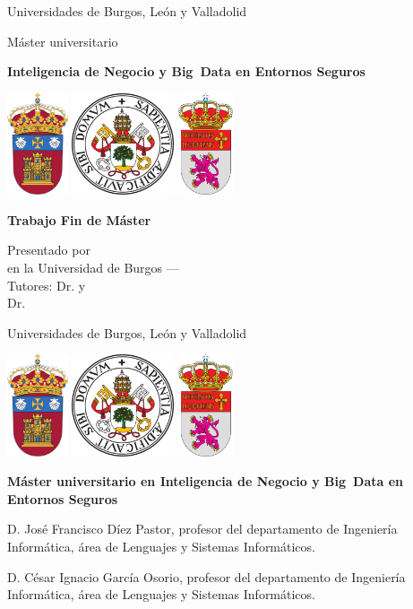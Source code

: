 \documentclass[a4paper,12pt,twoside]{memoir}
\title{\titulo}
\author{\nombre}
\date{\fecha}
\makeatletter
\def\maketitle{
	\null
	\thispagestyle{empty}
	\begin{center}%
		{\noindent\LARGE Universidades de Burgos, León y Valladolid}\vspace{.5cm}%

		{\noindent\large Máster universitario}\vspace{.5cm}%

		{\noindent\LARGE \textbf{Inteligencia de Negocio y Big~Data en Entornos Seguros}}\vspace{.5cm}%
	\end{center}%

	\begin{center}%
		\includegraphics[height=3cm]{img/escudoUBU} \hspace{1cm}
		\includegraphics[height=3cm]{img/escudoUVA} \hspace{1cm}
		\includegraphics[height=3cm]{img/escudoULE} \vspace{1cm}%
	\end{center}%

	\vfill
	\colorbox{cpardoBox}{%
		\begin{minipage}{.9\textwidth}
			\vspace{.4cm}\large
			\begin{center}
				\textbf{Trabajo Fin de Máster}\vspace{.6cm}\\
				\textbf{\Large\@title{}}
			\end{center}
			\vspace{.2cm}
		\end{minipage}

	}%
	\vfill
	\begin{center}%
		{%
			\noindent\Large
			Presentado por \@author{}\\
			en la Universidad de Burgos --- \@date{}\\[1em]
			Tutores: Dr. \@tutor{} y\\\hspace{3.7em}Dr. \@cotutor{}
		}%
	\end{center}%
	\null
	\cleardoublepage
}
\newcommand{\nombretutor}{José Francisco Díez Pastor}
\newcommand{\nombrecotutor}{César Ignacio García Osorio}
\makeatother
\begin{document}
\maketitle

\newpage\null\thispagestyle{empty}\newpage


\thispagestyle{empty}


\noindent
\begin{center}%
	{\noindent\Huge Universidades de Burgos, León y Valladolid}\vspace{.5cm}%

\begin{center}%
	\includegraphics[height=3cm]{img/escudoUBU} \hspace{1cm}
	\includegraphics[height=3cm]{img/escudoUVA} \hspace{1cm}
	\includegraphics[height=3cm]{img/escudoULE} \vspace{1cm}%
\end{center}%

	{\noindent\Large \textbf{Máster universitario en Inteligencia de Negocio y Big~Data en Entornos Seguros}}\vspace{.5cm}%
\end{center}%



\noindent D. \nombretutor, profesor del departamento de Ingeniería Informática, área de Lenguajes y Sistemas Informáticos.

\noindent D. \nombrecotutor, profesor del departamento de Ingeniería Informática, área de Lenguajes y Sistemas Informáticos.
\end{document}
